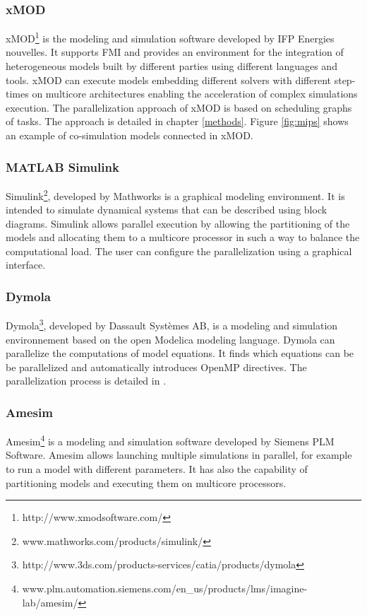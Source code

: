 \subsubsection{xMOD}
xMOD\footnote{http://www.xmodsoftware.com/} is the modeling and simulation software developed by IFP Energies nouvelles. It supports FMI and provides an environment for the integration of heterogeneous models built by different parties using different languages and tools. xMOD can execute models embedding different solvers with different step-times on multicore architectures enabling the acceleration of complex simulations execution. The parallelization approach of xMOD is based on scheduling graphs of tasks. The approach is detailed in chapter \ref{methods}. Figure \ref{fig:mips} shows an example of co-simulation models connected in xMOD. 


\subsubsection{MATLAB Simulink}
Simulink\footnote{www.mathworks.com/products/simulink/}, developed by Mathworks is a graphical modeling environment. It is intended to simulate dynamical systems that can be described using block diagrams. Simulink allows parallel execution by allowing the partitioning of the models and allocating them to a multicore processor in such a way to balance the computational load. The user can configure the parallelization using a graphical interface.

\subsubsection{Dymola}
Dymola\footnote{http://www.3ds.com/products-services/catia/products/dymola}, developed by Dassault Syst\`emes AB, is a modeling and simulation environnement based on the open Modelica modeling language. Dymola can parallelize the computations of model equations. It finds which equations can be be parallelized and automatically introduces OpenMP directives. The parallelization process is detailed in \cite{elmqvist:2014}.

\subsubsection{Amesim}
Amesim\footnote{www.plm.automation.siemens.com/en\_us/products/lms/imagine-lab/amesim/} is a modeling and simulation software developed by Siemens PLM Software. Amesim allows launching multiple simulations in parallel, for example to run a model with different parameters. It has also the capability of partitioning models and executing them on multicore processors.

